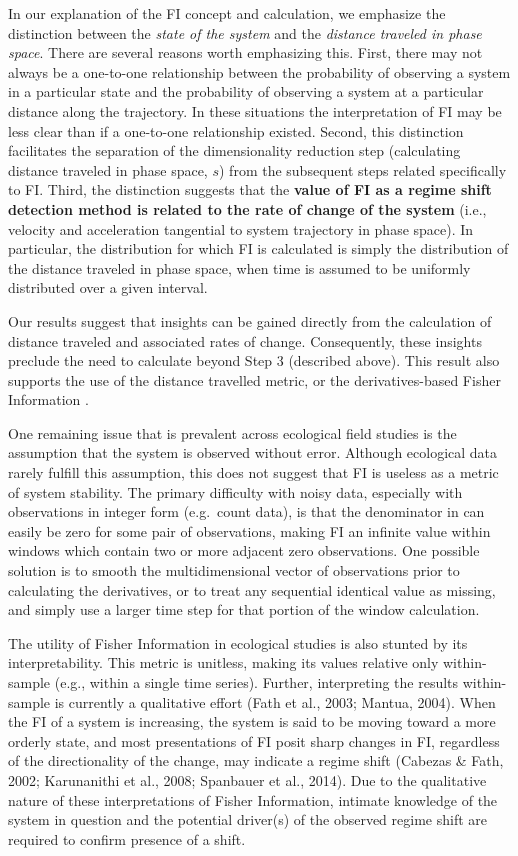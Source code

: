 \documentclass[12pt,twoside]{reedthesis}
\begin{document}
In our explanation of the FI concept and calculation, we emphasize the distinction between the \emph{state of the system} and the \emph{distance traveled in phase space}. There are several reasons worth emphasizing this. First, there may not always be a one-to-one relationship between the probability of observing a system in a particular state and the probability of observing a system at a particular distance along the trajectory. In these situations the interpretation of FI may be less clear than if a one-to-one relationship existed. Second, this distinction facilitates the separation of the dimensionality reduction step (calculating distance traveled in phase space, \(s\)) from the subsequent steps related specifically to FI. Third, the distinction suggests that the \textbf{value of FI as a regime shift detection method is related to the rate of change of the system} (i.e., velocity and acceleration tangential to system trajectory in phase space). In particular, the distribution for which FI is calculated is simply the distribution of the distance traveled in phase space, when time is assumed to be uniformly distributed over a given interval.

Our results suggest that insights can be gained directly from the calculation of distance traveled and associated rates of change. Consequently, these insights preclude the need to calculate beyond Step 3 (described above). This result also supports the use of the distance travelled metric, or the derivatives-based Fisher Information \label{eq:fiDerivs}.

One remaining issue that is prevalent across ecological field studies is the assumption that the system is observed without error. Although ecological data rarely fulfill this assumption, this does not suggest that FI is useless as a metric of system stability. The primary difficulty with noisy data, especially with observations in integer form (e.g.~count data), is that the denominator in can easily be zero for some pair of observations, making FI an infinite value within windows which contain two or more adjacent zero observations. One possible solution is to smooth the multidimensional vector of observations prior to calculating the derivatives, or to treat any sequential identical value as missing, and simply use a larger time step for that portion of the window calculation.

The utility of Fisher Information in ecological studies is also stunted by its interpretability. This metric is unitless, making its values relative only within-sample (e.g., within a single time series). Further, interpreting the results within-sample is currently a qualitative effort (Fath et al., 2003; Mantua, 2004). When the FI of a system is increasing, the system is said to be moving toward a more orderly state, and most presentations of FI posit sharp changes in FI, regardless of the directionality of the change, may indicate a regime shift (Cabezas \& Fath, 2002; Karunanithi et al., 2008; Spanbauer et al., 2014). Due to the qualitative nature of these interpretations of Fisher Information, intimate knowledge of the system in question and the potential driver(s) of the observed regime shift are required to confirm presence of a shift.
\end{document}
